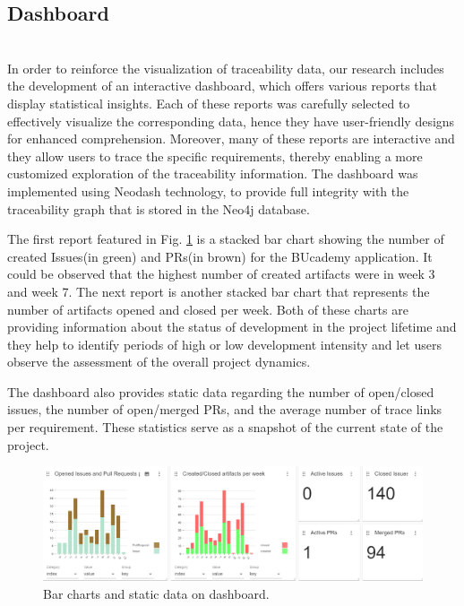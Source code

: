 \documentclass[conference]{IEEEtran}
\begin{document}
\subsection{Dashboard}
\label{sec:dboard}
\\

In order to reinforce the visualization of traceability data, our research includes the development of an interactive dashboard, which offers various reports that display statistical insights. Each of these reports was carefully selected to effectively visualize the corresponding data, hence they have user-friendly designs for enhanced comprehension. Moreover, many of these reports are interactive and they allow users to trace the specific requirements, thereby enabling a more customized exploration of the traceability information.
The dashboard was implemented using Neodash technology, to provide full integrity with the traceability graph that is stored in the Neo4j database.

The first report featured in Fig. \ref{fig:barcharts} is a stacked bar chart showing the number of created Issues(in green) and PRs(in brown) for the BUcademy application. It could be observed that the highest number of created artifacts were in week 3 and week 7. The next report is another stacked bar chart that represents the number of artifacts opened and closed per week. Both of these charts are providing information about the status of development in the project lifetime and they help to identify periods of high or low development intensity and let users observe the assessment of the overall project dynamics.

The dashboard also provides static data regarding the number of open/closed issues, the number of open/merged PRs, and the average number of trace links per requirement. These statistics serve as a snapshot of the current state of the project.

\begin{figure}[htb]
    \centering
    \includegraphics[width=0.9\linewidth]{figs/dashboard-barcharts.png}
    \caption{Bar charts and static data on dashboard.}
    \label{fig:barcharts}
\end{figure}
\end{document}
